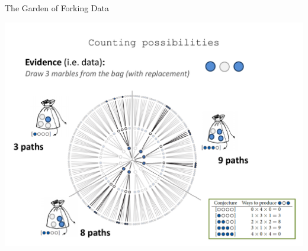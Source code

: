 \documentclass[12pt, aspectratio=149]{beamer}
\theoremstyle{plain}
\begin{document}
\begin{frame}[fragile]{The Garden of Forking Data}
	\begin{center}
		\includegraphics[height=0.8\textheight]{figs/forkingpaths.pdf}
	\end{center}
\end{frame}
\end{document}
